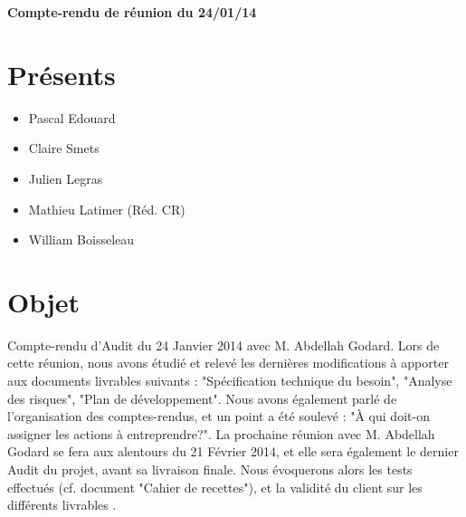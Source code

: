 \documentclass[a4paper,11pt,french]{article}
\author{\hmwkAuthorName}
\date{} %
\newcommand{\hmwkDocName}{Compte-rendu de réunion du 24/01/14} %
\begin{document}
\pagestyle{fancy}

\begin{center}\textbf{\Huge{\hmwkDocName}}\end{center}
        
\section{Présents}
\begin{itemize}
\item Pascal Edouard  
\item Claire Smets
\item Julien Legras
\item Mathieu Latimer (Réd. CR)
\item William Boisseleau
\end{itemize}

\section{Objet}
Compte-rendu d'Audit du 24 Janvier 2014 avec M. Abdellah Godard. Lors de cette réunion, nous avons étudié et relevé les dernières modifications à apporter aux 
documents livrables suivants : "Spécification technique du besoin", "Analyse des risques", "Plan de développement".
\newline
\newline
Nous avons également parlé de l'organisation des comptes-rendus, et un point a été soulevé : "À qui doit-on assigner les actions à entreprendre?".
\newline
\newline
La prochaine réunion avec M. Abdellah Godard se fera aux alentours du 21 Février 2014, et elle sera également le dernier Audit du projet, avant sa livraison finale.
Nous évoquerons alors les tests effectués (cf. document "Cahier de recettes"), et la validité du client sur les différents livrables .
\end{document}
